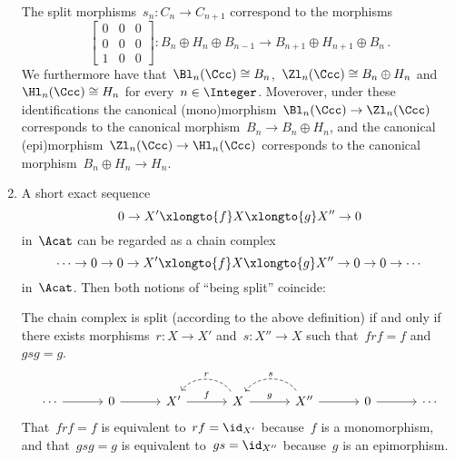 \begin{remark*}
\begin{enumerate}
      The split morphisms~$s_n \colon C_n \to C_{n+1}$ correspond to the morphisms
      \[
        \begin{bmatrix}
          0 & 0 & 0 \\
          0 & 0 & 0 \\
          1 & 0 & 0
        \end{bmatrix}
        \colon
        B_n \oplus H_n \oplus B_{n-1}
        \to
        B_{n+1} \oplus H_{n+1} \oplus B_n \,.
      \]
      We furthermore have that~$\Bl_n(\Ccc) \cong B_n$,~$\Zl_n(\Ccc) \cong B_n \oplus H_n$ and~$\Hl_n(\Ccc) \cong H_n$ for every~$n \in \Integer$.
      Moverover, under these identifications the canonical (mono)mor\-phism~$\Bl_n(\Ccc) \to \Zl_n(\Ccc)$ corresponds to the canonical morphism~$B_n \to B_n \oplus H_n$, and the canonical (epi)morphism~$\Zl_n(\Ccc) \to \Hl_n(\Ccc)$ corresponds to the canonical morphism~$B_n \oplus H_n \to H_n$.
    \item
      A short exact sequence
      \[
        0
        \to
        X'
        \xlongto{f}
        X
        \xlongto{g}
        X''
        \to
        0
      \]
      in~$\Acat$ can be regarded as a chain complex
      \[
        \dotsb
        \to
        0
        \to
        0
        \to
        X'
        \xlongto{f}
        X
        \xlongto{g}
        X''
        \to
        0
        \to
        0
        \to
        \dotsb
      \]
      in~$\Acat$.
      Then both notions of \enquote{being split} coincide:
      
      The chain complex is split (according to the above definition) if and only if there exists morphisms~$r \colon X \to X'$ and~$s \colon X'' \to X$ such that~$frf = f$ and~$gsg = g$.
      \[
        \begin{tikzcd}[column sep = 3.2em]
            \dotsb
            \arrow{r}
          & 0
            \arrow{r}
          & X'
            \arrow{r}[above]{f}
          & X
            \arrow[dashed, bend right=55]{l}[above]{r}
            \arrow{r}[above]{g}
          & X''
            \arrow[dashed, bend right=55]{l}[above]{s}
            \arrow{r}
          & 0
            \arrow{r}
          & \dotsb
        \end{tikzcd}
      \]
      That~$frf = f$ is equivalent to~$rf = \id_{X'}$ because~$f$ is a monomorphism, and that~$gsg = g$ is equivalent to~$gs = \id_{X''}$ because~$g$ is an epimorphism.
  \end{enumerate}
\end{remark*}


